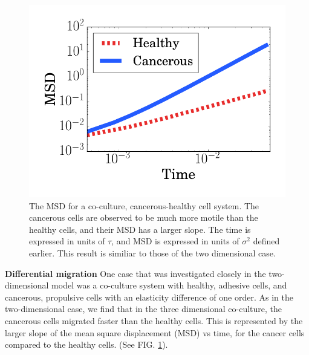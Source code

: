 \documentclass[aps,prb,twocolumn,groupedaddress,nofootinbib,floatfix]{revtex4}
\begin{document}
\begin{figure}
  \includegraphics[width=\columnwidth]{cocultureMSD.png}
  \caption[cocultureMSD]
    {The MSD for a co-culture, cancerous-healthy cell system. The cancerous cells
    are observed to be much more motile than the healthy cells, and their MSD has a larger slope. The time is expressed in units of $\tau$, and MSD is expressed
    in units of $\sigma^2$ defined earlier. This result is
    similiar to those of the two dimensional case\cite{Butcher}.}
  \label{fig:cocultureMSD}
\end{figure}

{\bf Differential migration}
One case that was investigated closely in the two-dimensional model was a co-culture system with healthy, adhesive cells, and cancerous, propulsive cells with an elasticity 
difference of one order. As in the two-dimensional case, we find that in the three dimensional co-culture, the cancerous cells migrated faster than the healthy cells. This is represented by the larger
slope of the mean square displacement (MSD) vs time, for the cancer cells compared to the healthy cells. (See FIG. \ref{fig:cocultureMSD}).
\end{document}
